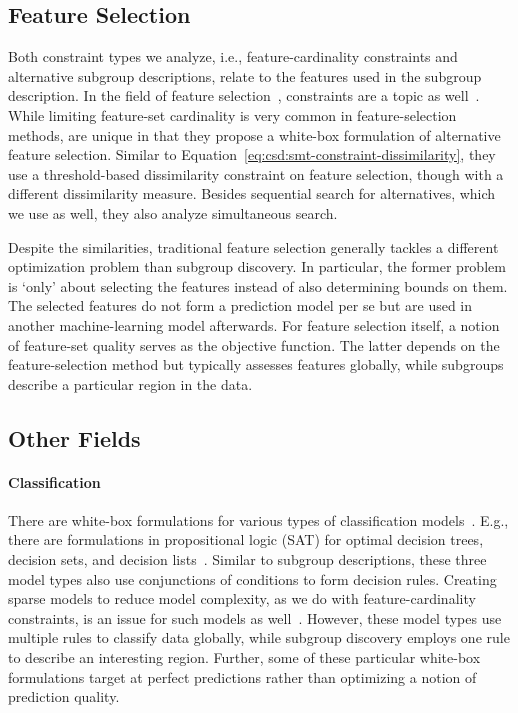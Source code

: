\documentclass{article}
\theoremstyle{definition}
\begin{document}
\subsection{Feature Selection}
\label{sec:csd:related-work:feature-selection}

Both constraint types we analyze, i.e., feature-cardinality constraints and alternative subgroup descriptions, relate to the features used in the subgroup description.
In the field of feature selection~\cite{guyon2003introduction, li2017feature}, constraints are a topic as well~\cite{bach2023finding, bach2024alternative, bach2022empirical}.
While limiting feature-set cardinality is very common in feature-selection methods, \cite{bach2023finding, bach2024alternative} are unique in that they propose a white-box formulation of alternative feature selection.
Similar to Equation~\ref{eq:csd:smt-constraint-dissimilarity}, they use a threshold-based dissimilarity constraint on feature selection, though with a different dissimilarity measure.
Besides sequential search for alternatives, which we use as well, they also analyze simultaneous search.

Despite the similarities, traditional feature selection generally tackles a different optimization problem than subgroup discovery.
In particular, the former problem is `only' about selecting the features instead of also determining bounds on them.
The selected features do not form a prediction model per se but are used in another machine-learning model afterwards.
For feature selection itself, a notion of feature-set quality serves as the objective function.
The latter depends on the feature-selection method but typically assesses features globally, while subgroups describe a particular region in the data.

\subsection{Other Fields}
\label{sec:csd:related-work:other}

\paragraph{Classification}

There are white-box formulations for various types of classification models~\cite{ignatiev2021reasoning}.
E.g., there are formulations in propositional logic (SAT) for optimal decision trees, decision sets, and decision lists~\cite{narodytska2018learning, shati2021sat, yu2021learning}.
Similar to subgroup descriptions, these three model types also use conjunctions of conditions to form decision rules.
Creating sparse models to reduce model complexity, as we do with feature-cardinality constraints, is an issue for such models as well~\cite{yu2021learning}.
However, these model types use multiple rules to classify data globally, while subgroup discovery employs one rule to describe an interesting region.
Further, some of these particular white-box formulations target at perfect predictions rather than optimizing a notion of prediction quality.
\end{document}
